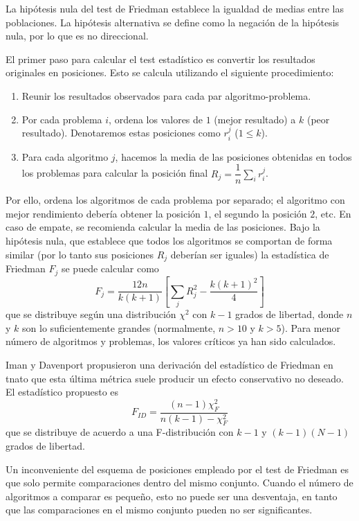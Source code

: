 La hipótesis nula del test de Friedman establece la igualdad de medias entre las poblaciones. 
La hipótesis alternativa se define como la negación de la hipótesis nula, por lo que es no direccional. 

El primer paso para calcular el test estadístico es convertir los resultados originales en posiciones. 
Esto se calcula utilizando el siguiente procedimiento:
\begin{enumerate}
	\item Reunir los resultados observados para cada par algoritmo-problema.
	\item Por cada problema $i$, ordena los valores de $1$ (mejor resultado) a $k$ (peor resultado). 
Denotaremos estas posiciones como $r_i^j$ ($1 \leq k$).
	\item Para cada algoritmo $j$, hacemos la media de las posiciones obtenidas en todos los problemas para calcular la posición final $R_j = \dfrac{1}{n} \sum_{i}r_i^j$.
\end{enumerate}

Por ello, ordena los algoritmos de cada problema por separado; el algoritmo con mejor rendimiento debería obtener la posición $1$, el segundo la posición $2$, etc. 
En caso de empate, se recomienda calcular la media de las posiciones. 
Bajo la hipótesis nula, que establece que todos los algoritmos se comportan de forma similar (por lo tanto sus posiciones $R_j$ deberían ser iguales) la estadística de Friedman $F_j$ se puede calcular como
\begin{equation}
F_j = \dfrac{12n}{k(k+1)} \left[ \sum_jR_j^2 - \dfrac{k(k+1)^2}{4} \right]
\label{eq:4.35}
\end{equation}
que se distribuye según una distribución $\chi^2$ con $k-1$ grados de libertad, donde $n$ y $k$ son lo suficientemente grandes (normalmente, $n>10$ y $k>5$). 
Para menor número de algoritmos y problemas, los valores críticos ya han sido calculados. 

Iman y Davenport propusieron una derivación del estadístico de Friedman en tnato que esta última métrica suele producir un efecto conservativo no deseado. 
El estadístico propuesto es
\begin{equation}
F_{ID} = \dfrac{(n-1)\chi_F^2}{n(k-1) - \chi_F^2}
\label{eq:4.36}
\end{equation}
que se distribuye de acuerdo a una F-distribución con $k-1$ y $(k-1)(N-1)$ grados de libertad. 

Un inconveniente del esquema de posiciones empleado por el test de Friedman es que solo permite comparaciones dentro del mismo conjunto. 
Cuando el número de algoritmos a comparar es pequeño, esto no puede ser una desventaja, en tanto que las comparaciones en el mismo conjunto pueden no ser significantes. 

